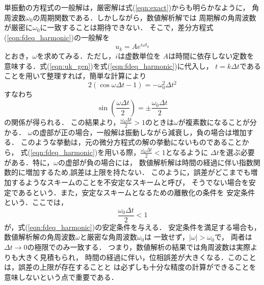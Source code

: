 \documentclass[10pt,a4j,dvipdfmx]{jarticle}
\begin{document}
単振動の方程式の一般解は，厳密解は式(\ref{eqn:exact})からも明らかなように，
角周波数$\omega_0$の周期関数である．しかしながら，数値解析解では
周期解の角周波数が厳密に$\omega_0$に一致することは期待できない．
そこで，差分方程式(\ref{eqn:fdeq_harmonic})の一般解を
\begin{equation}
	u_k=Ae^{i \omega t_k}
	\label{eqn:uk_gen}
\end{equation}
とおき，$\omega$を求めてみる．ただし，$i$は虚数単位を
$A$は時間に依存しない定数を意味する．式(\ref{eqn:uk_gen})を式(\ref{eqn:fdeq_harmonic})に代入し，
$t=k\Delta t$であることを用いて整理すれば，簡単な計算により
\begin{equation}
	2\left( \cos \omega \Delta t -1\right) =- \omega_0^2 \Delta t^2
	\label{eqn:}
\end{equation}
すなわち
\begin{equation}
	\sin \left( \frac{\omega \Delta t }{2} \right) = \pm \frac{\omega_0 \Delta t}{2} 
	\label{eqn:}
\end{equation}
の関係が得られる．
この結果より，$\frac{\omega_0\Delta t}{2}>1$のときは$\omega$が複素数になることが分かる．
$\omega$の虚部が正の場合，一般解は振動しながら減衰し，負の場合は増加する．
このような挙動は，元の微分方程式の解の挙動にないものであることから，
式(\ref{eqn:fdeq_harmonic})を用いる際，$\frac{\omega_0 \Delta t}{2}<1$となるように
$\Delta t$を選ぶ必要がある．特に，$\omega$の虚部が負の場合には，
数値解析解は時間の経過に伴い指数関数的に増加するため,誤差は上限を持たない．
このように，誤差がどこまでも増加するようなスキームのことを不安定なスキームと呼び，
そうでない場合を安定であるという．また，安定なスキームとなるための離散化の条件を
安定条件という．ここでは，
\begin{equation}
	\frac{\omega_0 \Delta t}{2} < 1
	\label{eqn:}
\end{equation}
が，式(\ref{eqn:fdeq_harmonic})の安定条件を与える．
安定条件を満足する場合も，数値解析解の角周波数$\omega$と厳密な角周波数$\omega_0$は
一致せず，$\left| \omega\right|  > \omega_0$で，
両者は$\Delta t \rightarrow 0$の極限でのみ一致する．
つまり，数値解析の結果では角周波数は実際よりも大きく見積もられ，
時間の経過に伴い，位相誤差が大きくなる．このことは，誤差の上限が存在することと
は必ずしも十分な精度の計算ができることを意味しないという点で重要である．
\end{document}
